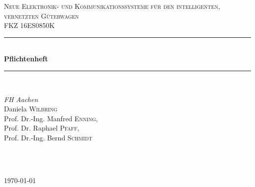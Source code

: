 \begin{titlepage}
    \newcommand{\HRule}{\rule{\linewidth}{0.5mm}} %
    \center %
    \vspace*{2cm}
    \textsc{\LARGE Neue Elektronik- und Kommunikationssysteme für den intelligenten, vernetzten Güterwagen}\\[1.5cm] %
    \textsc{\large FKZ 16ES0850K}\\[0.5cm] %
    \HRule \\[0.4cm]
    { \huge \bfseries Pflichtenheft}\\[0.4cm] %
    \HRule \\[1.5cm]
    \begin{minipage}{0.4\textwidth}
    \begin{flushleft} \large
    \emph{FH Aachen}\\
    Daniela \textsc{Wilbring}\\
    Prof. Dr.-Ing. Manfred \textsc{Enning},\\
    Prof. Dr. Raphael \textsc{Pfaff},\\
    Prof. Dr.-Ing. Bernd \textsc{Schmidt}\\
    \end{flushleft}
    \end{minipage}
    ~
    \begin{minipage}{0.4\textwidth}
    \begin{flushright} \large
    \end{flushright}
    \end{minipage}\\[2cm]
    {\large \today}\\[2cm] %
    \vfill %
\end{titlepage}
